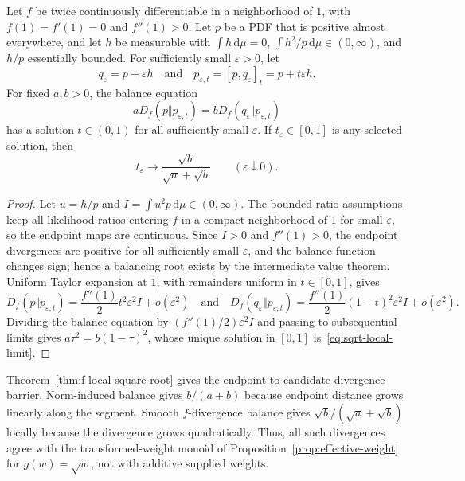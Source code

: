 \documentclass[runningheads]{llncs}
\newcommand{\dd}{\,\mathrm{d}}
\begin{document}
\begin{theorem}
\label{thm:f-local-square-root}
Let $f$ be twice continuously differentiable in a neighborhood of $1$, with
$f(1)=f'(1)=0$ and $f''(1)>0$. Let $p$ be a PDF that is positive almost everywhere, and let $h$ be measurable with
$\int h\dd\mu=0$, $\int h^2/p\dd\mu\in(0,\infty)$, and $h/p$
essentially bounded. For sufficiently small $\varepsilon>0$, let
\[q_\varepsilon=p+\varepsilon h
  \quad\text{and}\quad
  p_{\varepsilon,t}=[p,q_\varepsilon]_t=p+t\varepsilon h .
\]
For fixed $a,b>0$, the balance equation
\begin{equation}
  aD_f(p\Vert p_{\varepsilon,t})
  =
  bD_f(q_\varepsilon\Vert p_{\varepsilon,t})
  \label{eq:f-balance-local}
\end{equation}
has a solution $t\in(0,1)$ for all sufficiently small $\varepsilon$. If $t_\varepsilon\in[0,1]$ is any selected solution, then
\begin{equation}
  t_\varepsilon\longrightarrow
  \frac{\sqrt b}{\sqrt a+\sqrt b}
  \qquad (\varepsilon\downarrow0).
  \label{eq:sqrt-local-limit}
\end{equation}
\end{theorem}


\begin{proof}
Let $u=h/p$ and $I=\int u^2p\dd\mu\in(0,\infty)$. The bounded-ratio assumptions keep all likelihood ratios entering $f$ in a compact neighborhood of $1$ for small $\varepsilon$, so the endpoint maps are continuous. Since $I>0$ and $f''(1)>0$, the endpoint divergences are positive for all sufficiently small $\varepsilon$, and the balance function changes sign; hence a balancing root exists by the intermediate value theorem. Uniform Taylor expansion at $1$, with remainders uniform in $t\in[0,1]$, gives
\begin{equation*}
D_f(p\Vert p_{\varepsilon,t})=\frac{f''(1)}{2}t^2\varepsilon^2I+o(\varepsilon^2)\quad\text{and}\quad
D_f(q_\varepsilon\Vert p_{\varepsilon,t})=\frac{f''(1)}{2}(1-t)^2\varepsilon^2I+o(\varepsilon^2).
\end{equation*}
Dividing the balance equation by $(f''(1)/2)\varepsilon^2I$ and passing to subsequential limits gives $a\tau^2=b(1-\tau)^2$, whose unique solution in $[0,1]$ is~\eqref{eq:sqrt-local-limit}.
\end{proof}

Theorem~\ref{thm:f-local-square-root} gives the endpoint-to-candidate divergence barrier. Norm-induced balance gives $b/(a+b)$ because endpoint distance grows linearly along the segment. Smooth $f$-divergence balance gives $\sqrt b/(\sqrt a+\sqrt b)$ locally because the divergence grows quadratically. Thus, all such divergences agree  with the transformed-weight monoid of Proposition~\ref{prop:effective-weight} for $g(w)=\sqrt w$, not with additive supplied weights.
\end{document}
